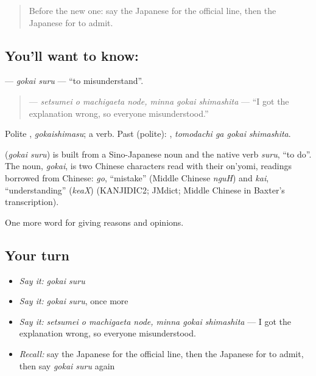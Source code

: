 \label{lesson:JA-C319-gokai-suru}



\begin{quote}
Before the new one: say the Japanese for the official line, then the Japanese for to admit.
\end{quote}

\subsection*{You'll want to know: }
\textbf{} — \emph{gokai suru} — \textquotedblleft{}to misunderstand\textquotedblright{}.

\begin{quote}
\textbf{  } — \emph{setsumei o machigaeta node, minna gokai shimashita} — \textquotedblleft{}I got the explanation wrong, so everyone misunderstood.\textquotedblright{}
\end{quote}

Polite \textbf{}, \emph{gokaishimasu}; a  verb. Past (polite): \textbf{ }, \emph{tomodachi ga gokai shimashita}.

\begin{cousinweb}
\textbf{} (\emph{gokai suru}) is built from a Sino-Japanese noun and the native verb \emph{suru}, \textquotedblleft{}to do\textquotedblright{}. The noun, \emph{gokai}, is two Chinese characters read with their on'yomi, readings borrowed from Chinese: \emph{go}, \textquotedblleft{}mistake\textquotedblright{} (Middle Chinese \emph{nguH}) and \emph{kai}, \textquotedblleft{}understanding\textquotedblright{} (\emph{keaX}) (KANJIDIC2; JMdict; Middle Chinese in Baxter's transcription).
\end{cousinweb}

\begin{grammarlens}[title={What you've built}]
One more word for giving reasons and opinions.
\end{grammarlens}

\subsection*{Your turn}
\begin{itemize}
\raggedright
  \item \emph{Say it:} \emph{gokai suru}
  \item \emph{Say it:} \emph{gokai suru}, once more
  \item \emph{Say it:} \emph{setsumei o machigaeta node, minna gokai shimashita} — I got the explanation wrong, so everyone misunderstood.
  \item \emph{Recall:} say the Japanese for the official line, then the Japanese for to admit, then say \emph{gokai suru} again
\end{itemize}

